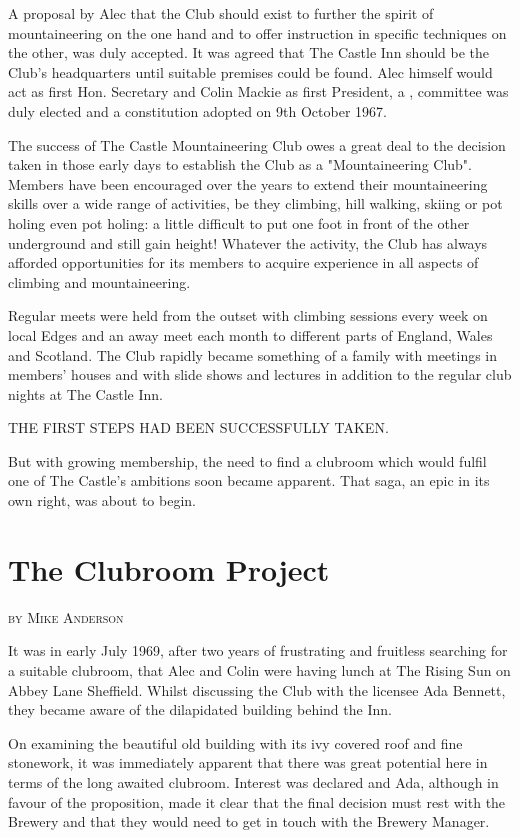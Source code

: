 \documentclass[a5paper,openany,font 10pt]{scrbook}
\makeatletter
\newcommand{\chapterauthor}[1]{%
{\parindent0pt\vspace*{-5pt}%
\linespread{1.1}\large\scshape#1%
\par\nobreak\vspace*{35pt}}
\@afterheading%
}
\makeatother
\begin{document}
A proposal by Alec that the Club should exist to further the spirit of
mountaineering on the one hand and to offer instruction in specific
techniques on the other, was duly accepted. It was agreed that The
Castle Inn should be the Club's headquarters until suitable premises
could be found. Alec himself would act as first Hon. Secretary and
Colin Mackie as first President, a , committee was duly elected and a
constitution adopted on 9th October 1967.

The success of The Castle Mountaineering Club owes a great deal to the
decision taken in those early days to establish the Club as a
"Mountaineering Club". Members have been encouraged over the years to
extend their mountaineering skills over a wide range of activities, be
they climbing, hill walking, skiing or pot holing even pot holing: a
little difficult to put one foot in front of the other underground and
still gain height! Whatever the activity, the Club has always afforded
opportunities for its members to acquire experience in all aspects of
climbing and mountaineering.

Regular meets were held from the outset with climbing sessions every
week on local Edges and an away meet each month to different parts of
England, Wales and Scotland. The Club rapidly became something of a
family with meetings in members' houses and with slide shows and
lectures in addition to the regular club nights at The Castle Inn.

THE FIRST STEPS HAD BEEN SUCCESSFULLY TAKEN.

But with growing membership, the need to find a clubroom which would
fulfil one of The Castle's ambitions soon became apparent. That saga,
an epic in its own right, was about to begin.


\chapter{The Clubroom Project}
\label{sec:orgheadline2}
\chapterauthor{by Mike Anderson}

It was in early July 1969, after two years of frustrating
and fruitless searching for a suitable clubroom, that Alec and
Colin were having lunch at The Rising Sun on Abbey Lane
Sheffield. Whilst discussing the Club with the licensee Ada
Bennett, they became aware of the dilapidated building behind the
Inn.

On examining the beautiful old building with its ivy covered
roof and fine stonework, it was immediately apparent that there
was great potential here in terms of the long awaited clubroom.
Interest was declared and Ada, although in favour of the
proposition, made it clear that the final decision must rest with
the Brewery and that they would need to get in touch with the
Brewery Manager.
\end{document}
